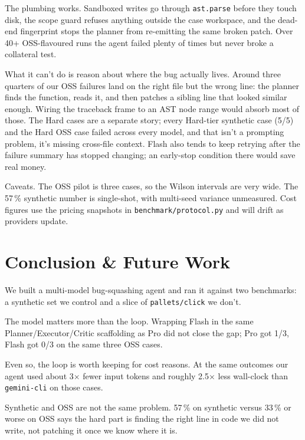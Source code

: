 \documentclass[11pt,letterpaper]{article}
\begin{document}
The plumbing works. Sandboxed writes go through \texttt{ast.parse} before they touch disk, the scope guard refuses anything outside the case workspace, and the dead-end fingerprint stops the planner from re-emitting the same broken patch. Over 40+ OSS-flavoured runs the agent failed plenty of times but never broke a collateral test.

What it can't do is reason about where the bug actually lives. Around three quarters of our OSS failures land on the right file but the wrong line: the planner finds the function, reads it, and then patches a sibling line that looked similar enough. Wiring the traceback frame to an AST node range would absorb most of those. The Hard cases are a separate story; every Hard-tier synthetic case (5/5) and the Hard OSS case failed across every model, and that isn't a prompting problem, it's missing cross-file context. Flash also tends to keep retrying after the failure summary has stopped changing; an early-stop condition there would save real money.

Caveats. The OSS pilot is three cases, so the Wilson intervals are very wide. The 57\,\% synthetic number is single-shot, with multi-seed variance unmeasured. Cost figures use the pricing snapshots in \texttt{benchmark/protocol.py} and will drift as providers update.

\section{Conclusion \& Future Work}

We built a multi-model bug-squashing agent and ran it against two benchmarks: a synthetic set we control and a slice of \texttt{pallets/click} we don't.

The model matters more than the loop. Wrapping Flash in the same Planner/Executor/Critic scaffolding as Pro did not close the gap; Pro got 1/3, Flash got 0/3 on the same three OSS cases.

Even so, the loop is worth keeping for cost reasons. At the same outcomes our agent used about 3$\times$ fewer input tokens and roughly 2.5$\times$ less wall-clock than \texttt{gemini-cli} on those cases.

Synthetic and OSS are not the same problem. 57\,\% on synthetic versus 33\,\% or worse on OSS says the hard part is finding the right line in code we did not write, not patching it once we know where it is.
\end{document}
